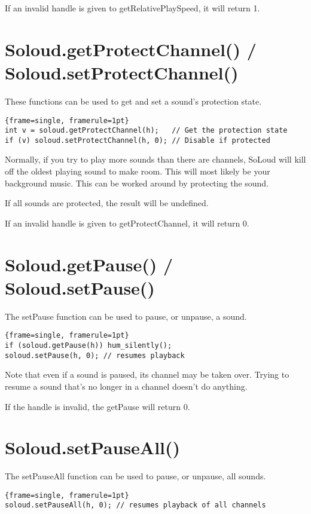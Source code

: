 If an invalid handle is given to getRelativePlaySpeed, it will return 1.

\section{Soloud.getProtectChannel() / Soloud.setProtectChannel()}

These functions can be used to get and set a sound's protection state.

\begin{lstlisting}{frame=single, framerule=1pt}
int v = soloud.getProtectChannel(h);   // Get the protection state
if (v) soloud.setProtectChannel(h, 0); // Disable if protected
\end{lstlisting}

Normally, if you try to play more sounds than there are channels, SoLoud will kill off the oldest playing sound to make room. This will most likely be your background music. This can be worked around by protecting the sound.

If all sounds are protected, the result will be undefined.

If an invalid handle is given to getProtectChannel, it will return 0.

\section{Soloud.getPause() / Soloud.setPause()}

The setPause function can be used to pause, or unpause, a sound.

\begin{lstlisting}{frame=single, framerule=1pt}
if (soloud.getPause(h)) hum_silently();
soloud.setPause(h, 0); // resumes playback
\end{lstlisting}

Note that even if a sound is paused, its channel may be taken over. Trying to resume a sound that's no longer in a channel doesn't do anything.

If the handle is invalid, the getPause will return 0.

\section{Soloud.setPauseAll()}

The setPauseAll function can be used to pause, or unpause, all sounds.

\begin{lstlisting}{frame=single, framerule=1pt}
soloud.setPauseAll(h, 0); // resumes playback of all channels
\end{lstlisting}

